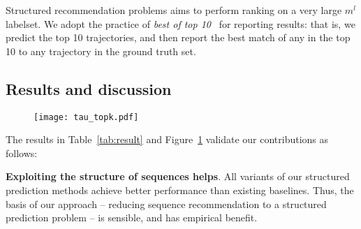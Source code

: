 Structured recommendation problems aims to perform ranking on a very large $m^l$ labelset.
We adopt the practice of {\em best of top 10}~\cite{russakovsky2015imagenet} for reporting results:
that is, we predict the top 10 trajectories, and then report the best match of any in the top 10 to any trajectory in the ground truth set.

\secmoveup
\subsection{Results and discussion}
\label{sec:result}
\textmoveup




\begin{figure}[!t]
		\centering
		\texttt{[image: tau\_topk.pdf]}
	    \label{fig:topk}
	    \vspace{-0.2in}
\end{figure}

The results in Table~\ref{tab:result} and Figure~\ref{fig:topk} validate our contributions as follows:

\textbf{Exploiting the structure of sequences helps}.
All variants of our structured prediction methods achieve better performance than existing baselines.
Thus, the basis of our approach -- reducing sequence recommendation to a structured prediction problem -- is sensible, and has empirical benefit.

